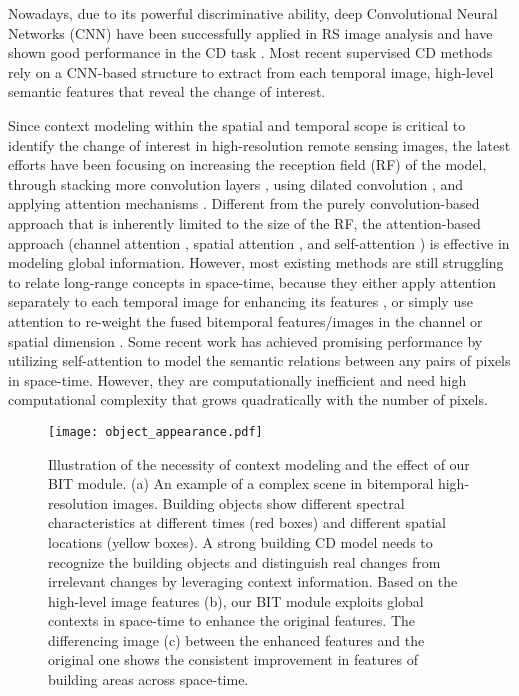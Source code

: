 \documentclass[journal]{IEEEtran}
\begin{document}
Nowadays, due to its powerful discriminative ability, deep Convolutional Neural Networks (CNN) have been successfully applied in RS image analysis and have shown good performance in the CD task \cite{Shi2020}. Most recent supervised CD methods \cite{Chen2020, Chen2020e, Zhang2020a, Zhang2019c, Liu2019b, Zhang2020b, Peng2020a, Jiang2020, Diakogiannis2020} rely on a CNN-based structure to extract from each temporal image, high-level semantic features that reveal the change of interest. 

Since context modeling within the spatial and temporal scope is critical to identify the change of interest in high-resolution remote sensing images, the latest efforts have been focusing on increasing the reception field (RF) of the model, through stacking more convolution layers \cite{Chen2020, Chen2020e, Zhang2019c, Zhang2020a}, using dilated convolution \cite{Zhang2019c}, and applying attention mechanisms \cite{Liu2019b, Zhang2020b, Peng2020a, Jiang2020, Chen2020e, Chen2020, Diakogiannis2020}. Different from the purely convolution-based approach that is inherently limited to the size of the RF, the attention-based approach (channel attention \cite{Liu2019b, Zhang2020b, Peng2020a, Jiang2020}, spatial attention \cite{Liu2019b, Zhang2020b, Peng2020a}, and self-attention \cite{Chen2020e, Chen2020, Diakogiannis2020}) is effective in modeling global information. However, most existing methods are still struggling to relate long-range concepts in space-time, because they either apply attention separately to each temporal image for enhancing its features \cite{Liu2019b}, or simply use attention to re-weight the fused bitemporal features/images in the channel or spatial dimension \cite{Zhang2020b, Peng2020a, Jiang2020, Fang2021}. Some recent work \cite{Chen2020e, Chen2020, Diakogiannis2020} has achieved promising performance by utilizing self-attention to model the semantic relations between any pairs of pixels in space-time. However, they are computationally inefficient and need high computational complexity that grows quadratically with the number of pixels.

\begin{figure*}
        \centering
        \texttt{[image: object\_appearance.pdf]}
        \caption{Illustration of the necessity of context modeling and the effect of our BIT module.
        (a) An example of a complex scene in bitemporal high-resolution images. Building objects show different spectral characteristics at different times (red boxes) and different spatial locations (yellow boxes). A strong building CD model needs to recognize the building objects and distinguish real changes from irrelevant changes by leveraging context information. Based on the high-level image features (b), our BIT module exploits global contexts in space-time to enhance the original features. The differencing image (c) between the enhanced features and the original one shows the consistent improvement in features of building areas across space-time.}
        \label{fig:image_appearance}
\end{figure*}
\end{document}
